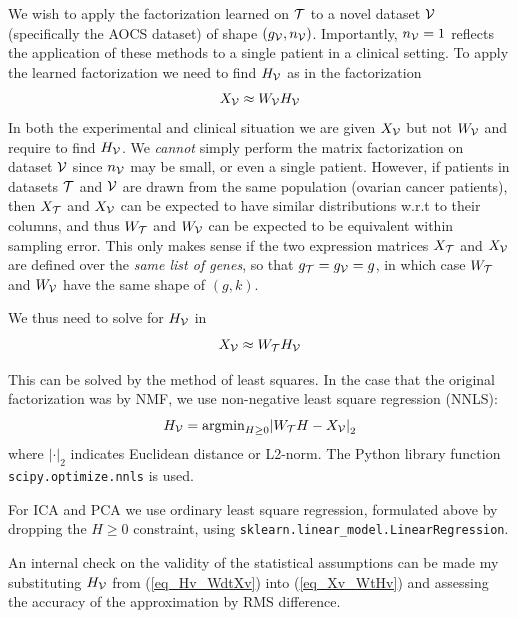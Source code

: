 \documentclass[draft, tikz, 12pt,a4paper,oneside,fleqn]{article}
\begin{document}
We wish to apply the factorization learned on $\mathcal{T}$ to a novel dataset $\mathcal{V}$ (specifically the AOCS dataset) of shape $(g_{\mathcal{V}}, n_{\mathcal{V}})$. Importantly, $n_{\mathcal{V}} = 1$ reflects the application of these methods to a single patient in a clinical setting.  To apply the learned factorization we need to find $H_{\mathcal{V}}$ as in the factorization
\begin{equation}
	X_{\mathcal{V}} \approx W_{\mathcal{V}} H_{\mathcal{V}}
\end{equation}
In both the experimental and clinical situation we are given $X_{\mathcal{V}}$ but not $W_{\mathcal{V}}$ and require to find $H_{\mathcal{V}}$.  We \emph{cannot} simply perform the matrix factorization on dataset $\mathcal{V}$ since $n_{\mathcal{V}}$ may be small, or even a single patient.   However, if patients in datasets $\mathcal{T}$ and $\mathcal{V}$ are drawn from the same population (ovarian cancer patients), then $X_{\mathcal{T}}$ and $X_{\mathcal{V}}$ can be expected to have similar distributions w.r.t to their columns, and thus $W_{\mathcal{T}}$ and $W_{\mathcal{V}}$ can be expected to be equivalent within sampling error.  This only makes sense if the two expression matrices $X_{\mathcal{T}}$ and $X_{\mathcal{V}}$ are defined over the \emph{same list of genes}, so that $g_{\mathcal{T}} = g_{\mathcal{V}} = g$, in which case $W_{\mathcal{T}}$ and $W_{\mathcal{V}}$ have the same shape of $(g, k)$.   

We thus need to solve for $H_{\mathcal{V}}$ in
\begin{equation}
	X_{\mathcal{V}}  \approx  W_{\mathcal{T}} H_{\mathcal{V}} \label{eq_Xv_WtHv}
\end{equation}

This can be solved by the method of least squares.  In the case that the original factorization was by NMF, we use non-negative least square regression (NNLS):
\begin{equation}
	H_{\mathcal{V}} = \mbox{argmin}_{H\geq 0}{\lvert W_{\mathcal{T}} H - X_{\mathcal{V}} \rvert}_2
	\label{eq_Hv_WdtXv}
\end{equation}
where ${\lvert \mathbf{\cdot} \rvert}_2$ indicates Euclidean distance or L2-norm.
The Python library function {\tt scipy.optimize.nnls} is used.

For ICA and PCA we use ordinary least square regression, formulated above by dropping the $H\geq 0$ constraint, using {\tt sklearn.linear\_model.LinearRegression}.

An internal check on the validity of the statistical assumptions can be made my substituting  $H_{\mathcal{V}}$ from (\ref{eq_Hv_WdtXv}) into (\ref{eq_Xv_WtHv}) and assessing the accuracy of the approximation by RMS difference.
\end{document}
